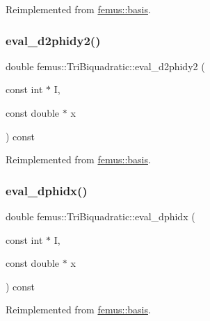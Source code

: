 Reimplemented from \mbox{\hyperlink{classfemus_1_1basis_ac9feaf9e60421143db2a3708f3c7fa48}{femus\+::basis}}.

\mbox{\label{classfemus_1_1_tri_biquadratic_a74610251368c2a83d701532e7b1931ed}} 
\subsubsection{\texorpdfstring{eval\+\_\+d2phidy2()}{eval\_d2phidy2()}}
{\footnotesize\ttfamily double femus\+::\+Tri\+Biquadratic\+::eval\+\_\+d2phidy2 (\begin{DoxyParamCaption}\item[{const int $\ast$}]{I,  }\item[{const double $\ast$}]{x }\end{DoxyParamCaption}) const\hspace{0.3cm}{\ttfamily [virtual]}}



Reimplemented from \mbox{\hyperlink{classfemus_1_1basis_a0febb29fe4b32213ff8d6d428f7241cd}{femus\+::basis}}.

\mbox{\label{classfemus_1_1_tri_biquadratic_a76b4223ec87d072fb08067629296c6dd}} 
\subsubsection{\texorpdfstring{eval\+\_\+dphidx()}{eval\_dphidx()}}
{\footnotesize\ttfamily double femus\+::\+Tri\+Biquadratic\+::eval\+\_\+dphidx (\begin{DoxyParamCaption}\item[{const int $\ast$}]{I,  }\item[{const double $\ast$}]{x }\end{DoxyParamCaption}) const\hspace{0.3cm}{\ttfamily [virtual]}}



Reimplemented from \mbox{\hyperlink{classfemus_1_1basis_a4db7d29cf8a753ddbccc4a297dafa0bf}{femus\+::basis}}.

